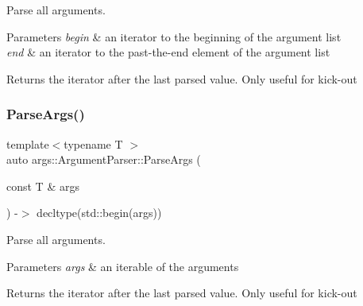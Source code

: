 Parse all arguments.


\begin{DoxyParams}{Parameters}
{\em begin} & an iterator to the beginning of the argument list \\
\hline
{\em end} & an iterator to the past-\/the-\/end element of the argument list \\
\hline
\end{DoxyParams}
\begin{DoxyReturn}{Returns}
the iterator after the last parsed value. Only useful for kick-\/out 
\end{DoxyReturn}
\mbox{\label{classargs_1_1_argument_parser_aa93289021e58e8ad26f06cd671261c36}} 
\subsubsection{\texorpdfstring{Parse\+Args()}{ParseArgs()}\hspace{0.1cm}{\footnotesize\ttfamily [2/2]}}
{\footnotesize\ttfamily template$<$typename T $>$ \\
auto args\+::\+Argument\+Parser\+::\+Parse\+Args (\begin{DoxyParamCaption}\item[{const T \&}]{args }\end{DoxyParamCaption}) -\/$>$ decltype(std\+::begin(args))
            \hspace{0.3cm}{\ttfamily [inline]}}

Parse all arguments.


\begin{DoxyParams}{Parameters}
{\em args} & an iterable of the arguments \\
\hline
\end{DoxyParams}
\begin{DoxyReturn}{Returns}
the iterator after the last parsed value. Only useful for kick-\/out 
\end{DoxyReturn}
\mbox{\label{classargs_1_1_argument_parser_ae8ff941317a3df4360c0c8d91f2823bd}} 
